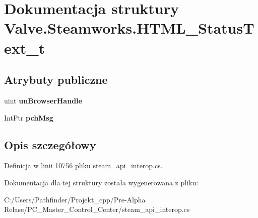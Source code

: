 \hypertarget{struct_valve_1_1_steamworks_1_1_h_t_m_l___status_text__t}{}\section{Dokumentacja struktury Valve.\+Steamworks.\+H\+T\+M\+L\+\_\+\+Status\+Text\+\_\+t}
\label{struct_valve_1_1_steamworks_1_1_h_t_m_l___status_text__t}
\subsection*{Atrybuty publiczne}
\begin{DoxyCompactItemize}
\item 
\mbox{\label{struct_valve_1_1_steamworks_1_1_h_t_m_l___status_text__t_ae6a649741ee30983a8b775d0bf3348dd}} 
uint {\bfseries un\+Browser\+Handle}
\item 
\mbox{\label{struct_valve_1_1_steamworks_1_1_h_t_m_l___status_text__t_a00f0e087d4acee71e3457a30f6f1effb}} 
Int\+Ptr {\bfseries pch\+Msg}
\end{DoxyCompactItemize}


\subsection{Opis szczegółowy}


Definicja w linii 10756 pliku steam\+\_\+api\+\_\+interop.\+cs.



Dokumentacja dla tej struktury została wygenerowana z pliku\+:\begin{DoxyCompactItemize}
\item 
C\+:/\+Users/\+Pathfinder/\+Projekt\+\_\+cpp/\+Pre-\/\+Alpha Relase/\+P\+C\+\_\+\+Master\+\_\+\+Control\+\_\+\+Center/steam\+\_\+api\+\_\+interop.\+cs\end{DoxyCompactItemize}
